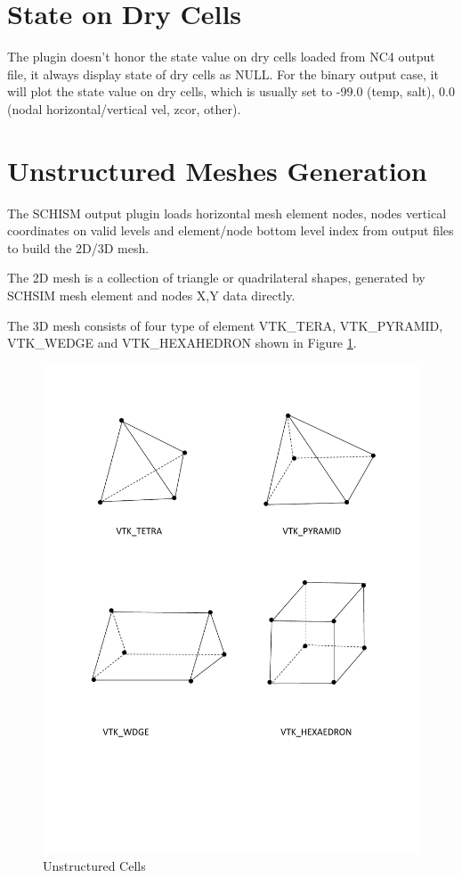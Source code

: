 \documentclass[12pt]{report}
\begin{document}
\section{State on Dry Cells}

  The plugin doesn't honor the state value on dry cells loaded from NC4 output file, it always display state of dry cells as NULL. For the binary output case, it will plot the state value on dry cells, which is usually set to -99.0 (temp, salt), 0.0 (nodal horizontal/vertical vel, zcor, other).
	
\section{Unstructured Meshes Generation}
	
	The SCHISM output plugin loads horizontal mesh element nodes, nodes vertical coordinates on valid levels and element/node bottom level index from output files to build the 2D/3D mesh. 

  The 2D mesh is a collection of triangle or quadrilateral shapes, generated by SCHSIM mesh element and nodes X,Y data directly. 
	
	The 3D mesh consists of four type of element VTK\_TERA, VTK\_PYRAMID, VTK\_WEDGE and VTK\_HEXAHEDRON shown in Figure \ref{figure:3dElements}.
				
				\begin{figure}
        \begin{center}
        \includegraphics[scale=0.75]{Element3D}
        \caption{Unstructured Cells}
        \label{figure:3dElements}
        \end{center}
        \end{figure}
				
\end{document}
